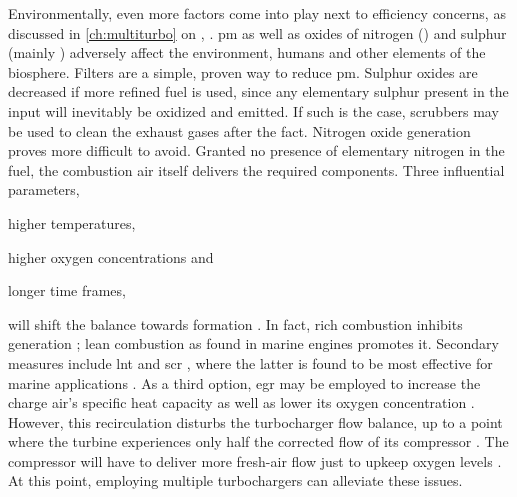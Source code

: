 \begin{appendices}
Environmentally, even more factors come into play next to efficiency concerns, as discussed in \cref{ch:multiturbo} on , \autocite[1347]{shahed_parametric_2009}.
\gls{pm} as well as oxides of nitrogen () and sulphur (mainly ) adversely affect the environment, humans and other elements of the biosphere.
Filters are a simple, proven way to reduce \gls{pm}.
Sulphur oxides are decreased if more refined fuel is used, since any elementary sulphur present in the input will inevitably be oxidized and emitted.
If such is the case, scrubbers may be used to clean the exhaust gases after the fact.
Nitrogen oxide generation proves more difficult to avoid.
Granted no presence of elementary nitrogen in the fuel, the combustion air itself delivers the required components.
Three influential parameters,
\begin{enumerate*}
\item higher temperatures,
\item higher oxygen concentrations and
\item longer time frames,
\end{enumerate*}
will shift the balance towards  formation \autocite[352\psq]{vanderlans_influence_1997}.
In fact, rich combustion inhibits  generation \autocite[270]{houshfar_experimental_2012}; lean combustion as found in marine  engines promotes it.
Secondary measures include \gls{lnt} \autocite{hu_advanced_2006} and \gls{scr} \autocite[121]{stone_introduction_2012}, where the latter is found to be most effective for marine applications \autocite{lamas_emissions_2012}.
As a third option, \gls{egr} may be employed to increase the charge air's specific heat capacity as well as lower its oxygen concentration \autocites[118]{stone_introduction_2012}{shojaeefard_cooled_2013}.
However, this recirculation disturbs the turbocharger flow balance, up to a point where the turbine experiences only half the corrected flow of its compressor \autocite[233]{arnold_single_2008}.
The compressor will have to deliver more fresh-air flow just to upkeep oxygen levels \autocite[2]{kech_turbocharging:_2014}.
At this point, employing multiple turbochargers can alleviate these issues.

\clearpage


\end{appendices}
